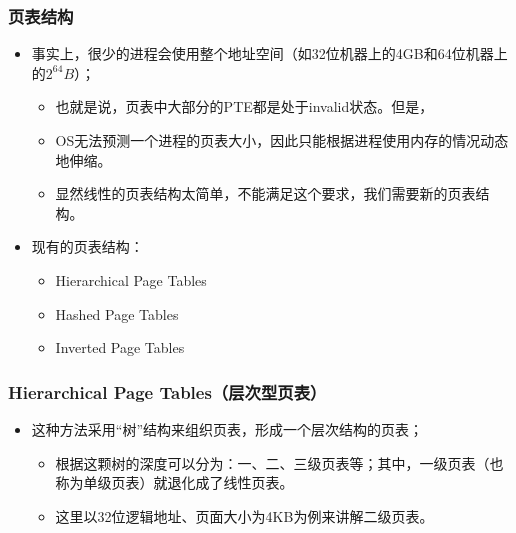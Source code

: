 \documentclass[CJKutf8,dvipsnames,table]{beamer}
\begin{document}
\begin{CJK*}{UTF8}{song}
  \begin{frame}
  \frametitle{页表结构} \pause
  \begin{itemize}
  \item{事实上，很少的进程会使用整个地址空间（如32位机器上的4GB和64位机器上的$2^{64}B$）；} \pause
    \begin{itemize}
    \item{也就是说，页表中大部分的PTE都是处于invalid状态。但是，} \pause
    \item{OS无法预测一个进程的页表大小，因此只能根据进程使用内存的情况动态地伸缩。} \pause
    \item{显然线性的页表结构太简单，不能满足这个要求，我们需要新的页表结构。} \pause
    \end{itemize}
  \item{现有的页表结构：} \pause
    \begin{itemize}
    \item{Hierarchical Page Tables} \pause
    \item{Hashed Page Tables} \pause
    \item{Inverted Page Tables}
    \end{itemize}
  \end{itemize}
  \end{frame}
  
  \begin{frame}
  \frametitle{Hierarchical Page Tables（层次型页表）} \pause
  \begin{itemize}
  \item{这种方法采用“树”结构来组织页表，形成一个层次结构的页表；} \pause
    \begin{itemize}
    \item{根据这颗树的深度可以分为：一、二、三级页表等；其中，一级页表（也称为单级页表）就退化成了线性页表。} \pause
    \item{这里以32位逻辑地址、页面大小为4KB为例来讲解二级页表。}
    \end{itemize}
  \end{itemize}
  \end{frame}
  

\end{CJK*}
\end{document}
